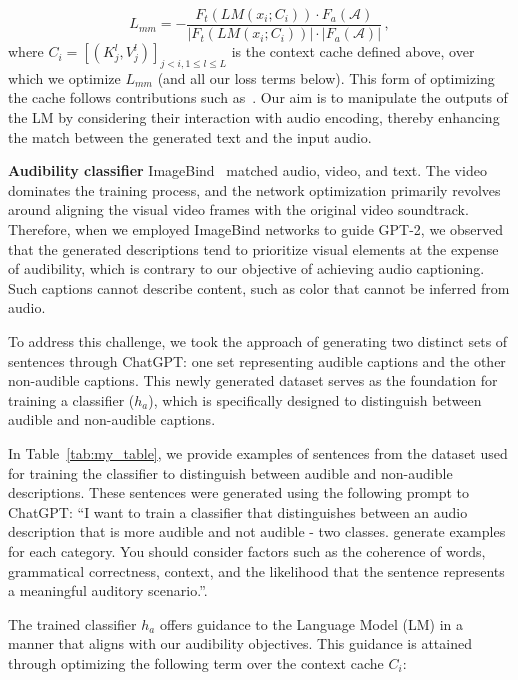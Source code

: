 \documentclass{article}
\begin{document}
\begin{equation}
\label{eq:one}
L_{mm}=  -\frac{F_t(LM(x_i;C_i)) \cdot F_a(\mathcal{A})}{\left\vert F_t(LM(x_i;C_i)) \right\vert \cdot \left\vert F_a(\mathcal{A}) \right\vert}\,, 
\end{equation}
where $C_i = [(K_j^l, V_j^l)]_{j<i,1\leq l\leq L}$ is the context cache defined above, over which we optimize $L_{mm}$ (and all our loss terms below). This form of optimizing the cache follows contributions such as~\cite{Dathathri2020Plug}. Our aim is to manipulate the outputs of the LM by considering their interaction with audio encoding, thereby enhancing the match between the generated text and the input audio.

 


\noindent\textbf{Audibility classifier\quad}
ImageBind~\cite{girdhar2023imagebind} matched audio, video, and text. The video dominates the training process, and the network optimization primarily revolves around aligning the visual video frames with the original video soundtrack. Therefore, when we employed ImageBind networks to guide GPT-2, we observed that the generated descriptions tend to prioritize visual elements at the expense of audibility, which is contrary to our objective of achieving audio captioning. Such captions cannot describe content, such as color that cannot be inferred from audio.

To address this challenge, we took the approach of generating two distinct sets of sentences through ChatGPT: one set representing audible captions and the other non-audible captions. This newly generated dataset serves as the foundation for training a classifier ($h_a$), which is specifically designed to distinguish between audible and non-audible captions.

In Table~\ref{tab:my_table}, we provide examples of sentences from the dataset used for training the classifier to distinguish between audible and non-audible descriptions. These sentences were generated using the following prompt to ChatGPT: ``I want to train a classifier that distinguishes between an audio description that is more audible and not audible - two classes. generate examples for each category. You should consider factors such as the coherence of words, grammatical correctness, context, and the likelihood that the sentence represents a meaningful auditory scenario.''.

The trained classifier $h_a$ offers guidance to the Language Model (LM) in a manner that aligns with our audibility objectives. This guidance is attained through optimizing the following term over the context cache $C_i$:
\end{document}

